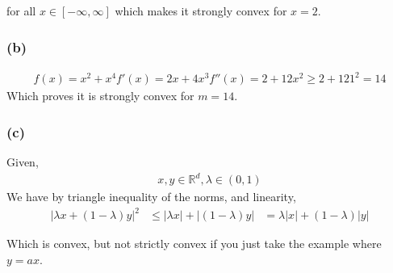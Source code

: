 \documentclass[letterpaper,10pt]{article} %
\newcommand{\lm}{\lambda}
\newcommand{\LML}[2]{\lm #1 + (1-\lm) #2}
\begin{document}
for all $x \in [-\infty,\infty]$ which makes it strongly convex for $x=2$.

\subsubsection*{(b)}
\begin{align*}
f(x) = x^2 + x^4
f'(x) = 2x + 4x^3
f''(x) = 2 + 12x^2 \geq 2 + 12 1^2 = 14
\end{align*}
Which proves it is strongly convex for $m=14$.

\subsubsection*{(c)}
Given,
\begin{align*}
x,y \in \mathbb{R}^d, \lm \in (0,1)
\end{align*}
We have by triangle inequality of the norms, and linearity,
\begin{align*}
\left| \LML{x}{y}\right|^2 &\leq \left|\lm x\right| + \left|(1-\lm)y\right|
&= \lm\left| x\right| + (1-\lm)\left|y\right|
\end{align*}

Which is convex, but not strictly convex if you just take the example where $y = a x$.

%
%

\end{document}
